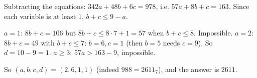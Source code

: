 Subtracting the equations: $342a+48b+6c=978$, i.e. $57a+8b+c=163$. Since each variable is at least $1$, $b+c\le 9-a$.

$a=1$: $8b+c=106$ but $8b+c\le 8\cdot7+1=57$ when $b+c\le8$. Impossible.
$a=2$: $8b+c=49$ with $b+c\le7$: $b=6,c=1$ (then $b=5$ needs $c=9$). So $d=10-9=1$.
$a\ge3$: $57a>163-9$, impossible.

So $(a,b,c,d)=(2,6,1,1)$ (indeed $988=2611_7$), and the answer is $\boxed{2611}$.
